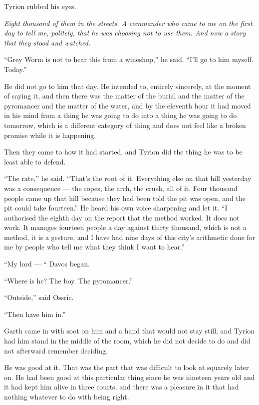 Tyrion rubbed his eyes.

\textit{Eight thousand of them in the streets. A commander who came to me on the first day to tell me, politely, that he was choosing not to use them. And now a story that they stood and watched.}

“Grey Worm is not to hear this from a wineshop,” he said. “I’ll go to him myself. Today.”

He did not go to him that day. He intended to, entirely sincerely, at the moment of saying it, and then there was the matter of the burial and the matter of the pyromancer and the matter of the water, and by the eleventh hour it had moved in his mind from a thing he was going to do into a thing he was going to do tomorrow, which is a different category of thing and does not feel like a broken promise while it is happening.

\sceneBreak

Then they came to how it had started, and Tyrion did the thing he was to be least able to defend.

“The rate,” he said. “That’s the root of it. Everything else on that hill yesterday was a consequence — the ropes, the arch, the crush, all of it. Four thousand people came up that hill because they had been told the pit was open, and the pit could take fourteen.” He heard his own voice sharpening and let it. “I authorised the eighth day on the report that the method worked. It does not work. It manages fourteen people a day against thirty thousand, which is not a method, it is a gesture, and I have had nine days of this city’s arithmetic done for me by people who tell me what they think I want to hear.”

“My lord — “ Davos began.

“Where is he? The boy. The pyromancer.”

“Outside,” said Ossric.

“Then have him in.”

\sceneBreak

Garth came in with soot on him and a hand that would not stay still, and Tyrion had him stand in the middle of the room, which he did not decide to do and did not afterward remember deciding.

He was good at it. That was the part that was difficult to look at squarely later on. He had been good at this particular thing since he was nineteen years old and it had kept him alive in three courts, and there was a pleasure in it that had nothing whatever to do with being right.


